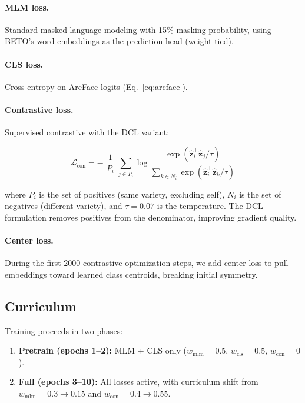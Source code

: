\documentclass[11pt,a4paper]{article}
\begin{document}
\paragraph{MLM loss.}
Standard masked language modeling with 15\% masking probability, using BETO's
word embeddings as the prediction head (weight-tied).

\paragraph{CLS loss.}
Cross-entropy on ArcFace logits (Eq.~\ref{eq:arcface}).

\paragraph{Contrastive loss.}
Supervised contrastive with the DCL variant:

\begin{equation}
    \mathcal{L}_{\text{con}} = -\frac{1}{|P_i|} \sum_{j \in P_i}
    \log \frac{\exp(\hat{\mathbf{z}}_i^\top \hat{\mathbf{z}}_j / \tau)}
    {\sum_{k \in N_i} \exp(\hat{\mathbf{z}}_i^\top \hat{\mathbf{z}}_k / \tau)}
    \label{eq:supcon}
\end{equation}

where $P_i$ is the set of positives (same variety, excluding self), $N_i$ is
the set of negatives (different variety), and $\tau = 0.07$ is the temperature.
The DCL formulation \citep{yeh2022decoupled} removes positives from the
denominator, improving gradient quality.

\paragraph{Center loss.}
During the first 2000 contrastive optimization steps, we add center loss
\citep{wen2016discriminative} to pull embeddings toward learned class centroids,
breaking initial symmetry.

\subsection{Curriculum}

Training proceeds in two phases:

\begin{enumerate}
    \item \textbf{Pretrain (epochs 1--2):} MLM + CLS only
    ($w_{\text{mlm}} = 0.5$, $w_{\text{cls}} = 0.5$, $w_{\text{con}} = 0$).
    \item \textbf{Full (epochs 3--10):} All losses active, with curriculum
    shift from $w_{\text{mlm}} = 0.3 \to 0.15$ and
    $w_{\text{con}} = 0.4 \to 0.55$.
\end{enumerate}
\end{document}
